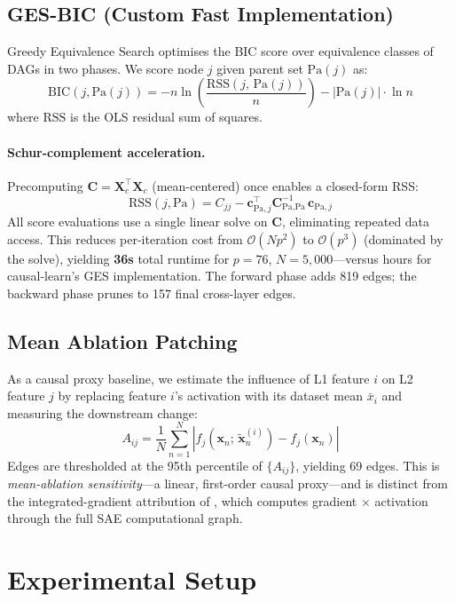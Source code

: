 \documentclass{article}
\begin{document}
\subsection{GES-BIC (Custom Fast Implementation)}

Greedy Equivalence Search \citep{chickering2002ges} optimises the BIC score
over equivalence classes of DAGs in two phases. We score node $j$ given parent
set $\text{Pa}(j)$ as:
\[
  \text{BIC}(j, \text{Pa}(j)) = -n \ln\!\!\left(\frac{\text{RSS}(j,\,\text{Pa}(j))}{n}\right)
  - |\text{Pa}(j)|\cdot\ln n
\]
where $\text{RSS}$ is the OLS residual sum of squares.

\paragraph{Schur-complement acceleration.}
Precomputing $\mathbf{C} = \mathbf{X}_c^\top \mathbf{X}_c$ (mean-centered)
once enables a closed-form RSS:
\[
  \text{RSS}(j, \text{Pa}) = C_{jj} -
  \mathbf{c}_{\text{Pa},j}^\top \mathbf{C}_{\text{Pa},\text{Pa}}^{-1}\,
  \mathbf{c}_{\text{Pa},j}
\]
All score evaluations use a single linear solve on $\mathbf{C}$, eliminating
repeated data access. This reduces per-iteration cost from
$\mathcal{O}(Np^2)$ to $\mathcal{O}(p^3)$ (dominated by the solve),
yielding \textbf{36s} total runtime for $p{=}76$, $N{=}5{,}000$---versus hours
for causal-learn's GES implementation. The forward phase adds 819 edges; the
backward phase prunes to 157 final cross-layer edges.

\subsection{Mean Ablation Patching}

As a causal proxy baseline, we estimate the influence of L1 feature $i$ on
L2 feature $j$ by replacing feature $i$'s activation with its dataset mean
$\bar{x}_i$ and measuring the downstream change:
\[
  A_{ij} = \frac{1}{N}\sum_{n=1}^{N}\!\left|
    f_j\!\left(\mathbf{x}_n;\,\tilde{\mathbf{x}}^{(i)}_n\right)
    - f_j(\mathbf{x}_n)\right|
\]
Edges are thresholded at the 95th percentile of $\{A_{ij}\}$, yielding 69
edges. This is \emph{mean-ablation sensitivity}---a linear, first-order causal
proxy---and is distinct from the integrated-gradient attribution of
\citet{marks2025sparse}, which computes gradient $\times$ activation through
the full SAE computational graph.

\section{Experimental Setup}
\end{document}
